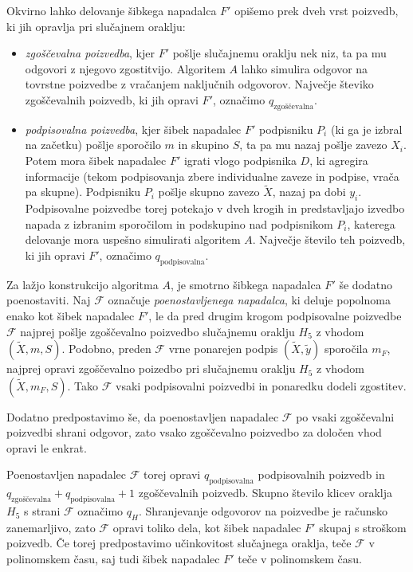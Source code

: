 \begin{dokaz}
Okvirno lahko delovanje šibkega napadalca $F'$ opišemo prek dveh vrst poizvedb, ki jih opravlja pri
slučajnem oraklju:
\begin{itemize}
    \item \textit{zgoščevalna poizvedba}, kjer $F'$ pošlje slučajnemu oraklju nek niz, ta pa mu
        odgovori z njegovo zgostitvijo. Algoritem $A$ lahko simulira odgovor na tovrstne poizvedbe z
        vračanjem naključnih odgovorov. Največje števiko zgoščevalnih poizvedb, ki jih opravi $F'$,
        označimo $q_{\text{zgoščevalna}}$.
    \item \textit{podpisovalna poizvedba}, kjer šibek napadalec $F'$ podpisniku $P_i$ (ki ga je
        izbral na začetku) pošlje sporočilo $m$ in skupino $S$, ta pa mu nazaj pošlje zavezo $X_i$.
        Potem mora šibek napadalec $F'$ igrati vlogo podpisnika $D$, ki agregira informacije (tekom
        podpisovanja zbere individualne zaveze in podpise, vrača pa skupne). Podpisniku $P_i$ pošlje
        skupno zavezo $\tilde{X}$, nazaj pa dobi $y_i$. Podpisovalne poizvedbe torej potekajo v dveh
        krogih in predstavljajo izvedbo napada z izbranim sporočilom in podskupino nad podpisnikom
        $P_i$, katerega delovanje mora uspešno simulirati algoritem $A$. Največje število teh poizvedb,
        ki jih opravi $F'$, označimo $q_{\text{podpisovalna}}$.
\end{itemize}

Za lažjo konstrukcijo algoritma $A$, je smotrno šibkega napadalca $F'$ še dodatno poenostaviti. Naj $\mathcal{F}$ označuje
\textit{poenostavljenega napadalca}, ki deluje popolnoma enako kot šibek napadalec $F'$, le da pred
drugim krogom podpisovalne poizvedbe $\mathcal{F}$ najprej pošlje zgoščevalno poizvedbo slučajnemu
oraklju $H_5$ z vhodom $(\tilde{X}, m, S)$. Podobno, preden $\mathcal{F}$ vrne ponarejen podpis
$(\tilde{X}, \tilde{y})$ sporočila $m_F$, najprej opravi zgoščevalno poizedbo pri slučajnemu oraklju
$H_5$ z vhodom $(\tilde{X}, m_F, S)$. Tako $\mathcal{F}$ vsaki podpisovalni poizvedbi in ponaredku
dodeli zgostitev.

Dodatno predpostavimo še, da poenostavljen napadalec $\mathcal{F}$ po vsaki zgoščevalni poizvedbi
shrani odgovor, zato vsako zgoščevalno poizvedbo za določen vhod opravi le enkrat. 

Poenostavljen napadalec $\mathcal{F}$ torej opravi $q_{\text{podpisovalna}}$ podpisovalnih poizvedb
in $q_{\text{zgoščevalna}} + q_{\text{podpisovalna}} + 1$ zgoščevalnih poizvedb. Skupno število
klicev oraklja $H_5$ s strani $\mathcal{F}$ označimo $q_H$. Shranjevanje odgovorov na poizvedbe je
računsko zanemarljivo, zato $\mathcal{F}$ opravi toliko dela, kot šibek napadalec $F'$ skupaj s
stroškom poizvedb. Če torej predpostavimo učinkovitost slučajnega oraklja, teče $\mathcal{F}$ v
polinomskem času, saj tudi šibek napadalec $F'$ teče v polinomskem času.


\end{dokaz}
